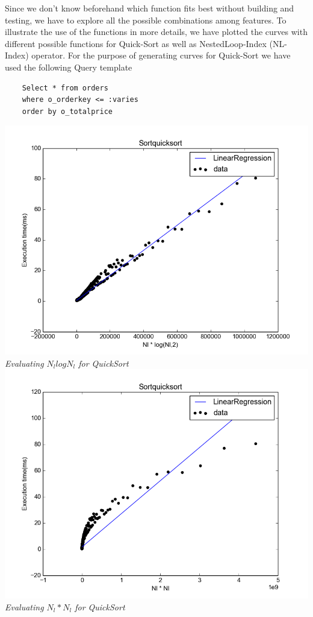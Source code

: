 \documentclass{article}
\begin{document}
\begin{multicols}{2}
	Since we don't know beforehand which function fits best without building 
	and testing, we have to explore all the possible combinations among features. 
	To illustrate the use of the functions in more details, we have plotted the curves
	with different possible functions for Quick-Sort as well as NestedLoop-Index (NL-Index) operator. For the purpose of generating curves for Quick-Sort we have used the 
	following Query template 
	
	\begin{framed}
	\begin{verbatim}
	Select * from orders
	where o_orderkey <= :varies 
	order by o_totalprice
	\end{verbatim}
	\end{framed}

\begin{center}

	\includegraphics[scale=0.37]{Plots/quicksortnlogn.png}
	\textit{\small Evaluating $N_{l} log N_{l}$ for QuickSort}
	\includegraphics[scale=0.37]{Plots/quicksortnl2.png}	
	\textit{\small Evaluating $N_{l}*N_{l}$ for QuickSort}
	

\end{center}
\end{multicols}
\end{document}
